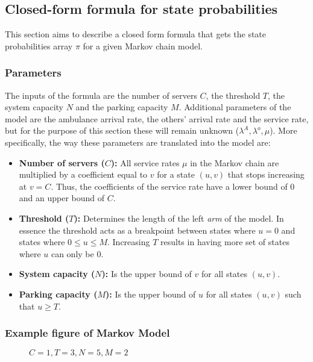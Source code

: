 \subsection{Closed-form formula for state probabilities}

This section aims to describe a closed form formula that gets the state probabilities array \(\pi\) for a given Markov chain model.

\subsubsection{Parameters}
The inputs of the formula are the number of servers \(C\), the threshold \(T\), the system capacity \(N\) and the parking capacity \(M\). Additional parameters of the model are the ambulance arrival rate, the others' arrival rate and the service rate, but for the purpose of this section these will remain unknown (\(\lambda^A, \lambda^o, \mu\)). More specifically, the way these parameters are translated into the model are:

\begin{itemize}
    \item \textbf{Number of servers (\(C\)):} All service rates \(\mu\) in the Markov chain are multiplied by a coefficient equal to \(v\) for a state \((u,v)\) that stops increasing at \(v=C\). Thus, the coefficients of the service rate have a lower bound of \(0\) and an upper bound of \(C\).
    \item \textbf{Threshold (\(T\)):} Determines the length of the left \textit{arm} of the model. In essence the threshold acts as a breakpoint between states where \(u=0\) and states where \(0 \leq u \leq M\). Increasing \(T\) results in having more set of states where \(u\) can only be \(0\).
    \item \textbf{System capacity (\(N\)):} Is the upper bound of \(v\) for all states \((u,v)\).
    \item \textbf{Parking capacity (\(M\)):} Is the upper bound of \(u\) for all states \((u,v)\) such that \(u \geq T\).
\end{itemize}


\subsubsection{Example figure of Markov Model}

\begin{figure}[h]
    \centering
    
    \caption{\(C=1, T=3, N=5, M=2\)}
    \label{fig:Markov_1352_example_for_closed_form}
\end{figure}

